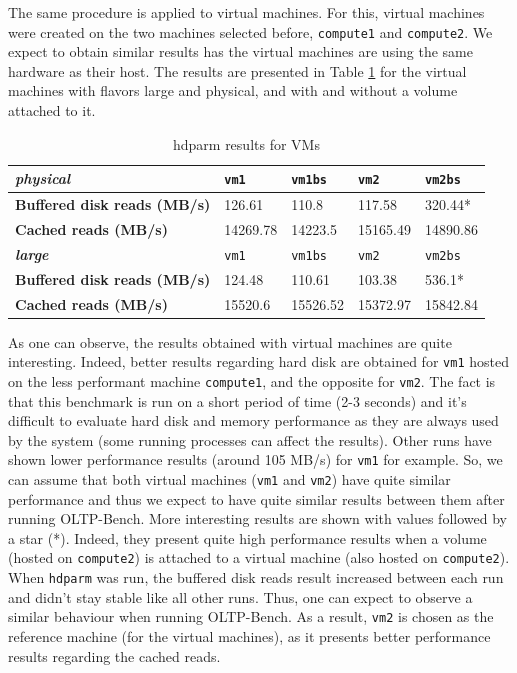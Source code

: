 The same procedure is applied to virtual machines.
For this, virtual machines were created on the two machines selected before, \texttt{compute1} and \texttt{compute2}.
We expect to obtain similar results has the virtual machines are using the same hardware as their host.
The results are presented in Table \ref{table:hdparm_res_VM} for the virtual machines with flavors large and physical, and with and without a volume attached to it.

\begin{table}[h]
	\centering
	\begin{tabular}{|m{6.5cm}|m{1.5cm}|m{1.5cm}|m{1.5cm}|m{1.5cm}|}
		\hline
		\textbf{\textit{physical}} & 
		\texttt{vm1} & 
		\texttt{vm1bs} & 
		\texttt{vm2} & 
		\texttt{vm2bs} \\
		\hline
		\textbf{Buffered disk reads (MB/s)} & 
		126.61 & 
		110.8 & 
		117.58 & 
		320.44* \\
		\hline
		\textbf{Cached reads (MB/s)} &  
		14269.78 & 
		14223.5 & 
		15165.49 & 
		14890.86 \\
		\hline\hline
		\textbf{\textit{large}} & 
		\texttt{vm1} & 
		\texttt{vm1bs} & 
		\texttt{vm2} & 
		\texttt{vm2bs} \\
		\hline
		\textbf{Buffered disk reads (MB/s)} & 
		124.48 & 
		110.61 & 
		103.38 & 
		536.1* \\
		\hline
		\textbf{Cached reads (MB/s)} &  
		15520.6 & 
		15526.52 & 
		15372.97 & 
		15842.84 \\
		\hline
	\end{tabular}
	\caption{hdparm results for VMs}
	\label{table:hdparm_res_VM}
\end{table}

As one can observe, the results obtained with virtual machines are quite interesting.
Indeed, better results regarding hard disk are obtained for \texttt{vm1} hosted on the less performant machine \texttt{compute1}, and the opposite for \texttt{vm2}.
The fact is that this benchmark is run on a short period of time (2-3 seconds) and 
it's difficult to evaluate hard disk and memory performance as they are always used by the system (some running processes can affect the results). 
Other runs have shown lower performance results (around 105 MB/s) for \texttt{vm1} for example.
So, we can assume that both virtual machines (\texttt{vm1} and \texttt{vm2}) have quite similar performance and thus we expect to have quite similar results between them after running OLTP-Bench.
More interesting results are shown with values followed by a star (*). 
Indeed, they present quite high performance results when a volume (hosted on \texttt{compute2}) is attached to a virtual machine (also hosted on \texttt{compute2}).
When \texttt{hdparm} was run, the buffered disk reads result increased between each run and didn't stay stable like all other runs.
Thus, one can expect to observe a similar behaviour when running OLTP-Bench.
As a result, \texttt{vm2} is chosen as the reference machine (for the virtual machines), as it presents better performance results regarding the cached reads.


